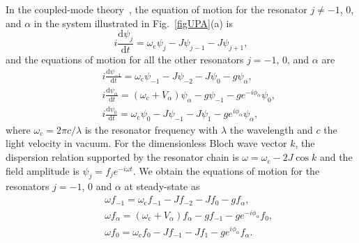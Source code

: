 \documentclass[prl,showpacs,superscriptaddress,twocolumn]{revtex4-1}
\begin{document}
\begin{widetext}
In the coupled-mode theory~\cite{Haus,Joannopoulos}, the equation of motion
for the resonator $j\neq -1$, $0$, and $\alpha $ in the system illustrated
in Fig.~\ref{figUPA}(a) is%
\begin{equation}
i\frac{\mathrm{d}\psi _{j}}{\mathrm{d}t}=\omega _{\mathrm{c}}\psi _{j}-J\psi
_{j-1}-J\psi _{j+1},  \label{1}
\end{equation}%
and the equations of motion for all the other resonators $j=-1$, $0$, and $%
\alpha $ are
\begin{eqnarray}
&&i\frac{\mathrm{d}\psi _{-1}}{\mathrm{d}t}=\omega _{\mathrm{c}}\psi
_{-1}-J\psi _{-2}-J\psi _{0}-g\psi _{\alpha },  \label{2} \\
&&i\frac{\mathrm{d}\psi _{\alpha }}{\mathrm{d}t}=\left( \omega _{\mathrm{c}%
}+V_{\alpha }\right) \psi _{\alpha }-g\psi _{-1}-ge^{-i\phi _{\alpha }}\psi
_{0},  \label{3} \\
&&i\frac{\mathrm{d}\psi _{0}}{\mathrm{d}t}=\omega _{\mathrm{c}}\psi
_{0}-J\psi _{-1}-J\psi _{1}-ge^{i\phi _{\alpha }}\psi _{\alpha },  \label{4}
\end{eqnarray}%
where $\omega _{\mathrm{c}}=2\pi c/\lambda $ is the resonator frequency with
$\lambda $ the wavelength and $c$ the light velocity in vacuum. For the
dimensionless Bloch wave vector $k$, the dispersion relation supported by
the resonator chain is $\omega =\omega _{\mathrm{c}}-2J\cos k$ and the field
amplitude is $\psi _{j}=f_{j}e^{-i\omega t}$. We obtain the equations of
motion for the resonators $j=-1$, $0$ and $\alpha $ at steady-state as
\begin{eqnarray}
&&\omega f_{-1}=\omega _{\mathrm{c}}f_{-1}-Jf_{-2}-Jf_{0}-gf_{\alpha },
\label{5} \\
&&\omega f_{\alpha }=\left( \omega _{\mathrm{c}}+V_{\alpha }\right)
f_{\alpha }-gf_{-1}-ge^{-i\phi _{\alpha }}f_{0},  \label{6} \\
&&\omega f_{0}=\omega _{\mathrm{c}}f_{0}-Jf_{-1}-Jf_{1}-ge^{i\phi _{\alpha
}}f_{\alpha }.  \label{7}
\end{eqnarray}


\end{widetext}
\end{document}
